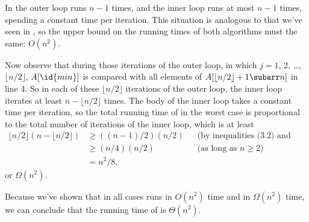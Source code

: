 In  the outer loop runs $n-1$ times, and the inner loop runs at most $n-1$ times, spending a constant time per iteration.
This situation is analogous to that we've seen in , so the upper bound on the running times of both algorithms must the same: $O(n^2)$.

Now observe that during those iterations of the outer loop, in which $j=1$, 2, \dots, $\lfloor n/2\rfloor$, $A[\id{min}]$ is compared with all elements of $A[\lfloor n/2\rfloor+1\subarr n]$ in line 4.
So in each of these $\lfloor n/2\rfloor$ iterations of the outer loop, the inner loop iterates at least $n-\lfloor n/2\rfloor$ times.
The body of the inner loop takes a constant time per iteration, so the total running time of  in the worst case is proportional to the total number of iterations of the inner loop, which is at least
\begin{align*}
    \lfloor n/2\rfloor(n-\lfloor n/2\rfloor) &\ge ((n-1)/2)(n/2) && \text{(by inequalities (3.2) and (3.8))} \\
    &\ge (n/4)(n/2) && \text{(as long as $n\ge2$)} \\
    &= n^2\!/8,
\end{align*}
or $\Omega(n^2)$.

Because we've shown that in all cases  runs in $O(n^2)$ time and in $\Omega(n^2)$ time, we can conclude that the running time of  is $\Theta(n^2)$.
